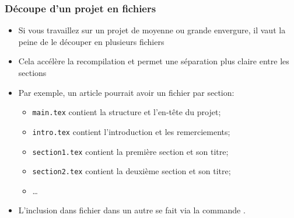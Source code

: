 \begin{frame}[fragile]
  \frametitle{Découpe d'un projet en fichiers}
  \begin{itemize}
    \item Si vous travaillez sur un projet de moyenne ou grande envergure, il vaut la peine de le découper en plusieurs fichiers
    \item Cela accélère la recompilation et permet une séparation plus claire entre les sections
    \item Par exemple, un article pourrait avoir un fichier par section:
    \begin{itemize}
      \item \texttt{main.tex} contient la structure et l'en-tête du projet;
      \item \texttt{intro.tex} contient l'introduction et les remerciements;
      \item \texttt{section1.tex} contient la première section et son titre;
      \item \texttt{section2.tex} contient la deuxième section et son titre;
      \item \dots
    \end{itemize}
    \item L'inclusion dans fichier dans un autre se fait via la commande \lstinline||.
  \end{itemize}
\end{frame}

\begin{comment}
\begin{frame}[fragile]
  \frametitle{Découpe d'un projet en fichiers}
  \framesubtitle{input et include}
  \begin{itemize}
    \item Deux commandes permettent l'inclusion d'un fichier dans un autre: \lstinline|| et \lstinline||
    \item On leur donne en argument le nom du fichier sans le \texttt{.tex}
    \item \lstinline|| \og{}copie\fg{} le document littéralement
    \item \lstinline|| termine la page courante, copie le document, puis termine la page courante à nouveau
    \item \lstinline|| peut se trouver n'importe où, y compris dans le préambule, tandis que \lstinline|| doit se trouver dans le corps du document
    \item \lstinline|| accélère la compilation du document, car cela permet de ne recompiler que ce qui a été modifié
    \item La commande \lstinline|| permet de restreindre les documents à inclure
  \end{itemize}
\end{frame}
\end{comment}

